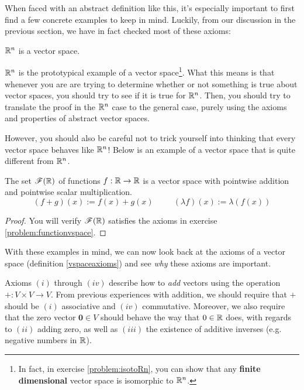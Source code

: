     
When faced with an abstract definition like this, it's especially important to first find a few concrete examples to keep in mind.  Luckily, from our discussion in the previous section, we have in fact checked most of these axioms:
    
    
    \begin{example}
    \vspace{-1em}
    \begin{theorem}
    $\mathbb{R}^n$ is a vector space.
    \end{theorem}
    \end{example}
    
    $\mathbb{R}^n$ is the prototypical example of a vector space\footnote{In fact, in exercise \ref{problem:isotoRn}, you can show that any \textbf{finite dimensional} vector space is isomorphic to $\mathbb{R}^n$.}.  What this means is that whenever you are are trying to determine whether or not something is true about vector spaces, you should try to see if it is true for $\mathbb{R}^n$.  Then, you should try to translate the proof in the $\mathbb{R}^n$ case to the general case, purely using the axioms and properties of abstract vector spaces.
    
    However, you should also be careful not to trick yourself into thinking that every vector space behaves like $\mathbb{R}^n$!  Below is an example of a vector space that is quite different from $\mathbb{R}^n$. 
    
    \begin{example}
    \vspace{-1em}
    \begin{theorem}\label{functionsvspace}
    The set $\mathscr{F}(\mathbb{R})$ of functions $f : \mathbb{R} \to \mathbb{R}$ is a vector space with pointwise addition and pointwise scalar multiplication.  $$(f + g)(x) := f(x) + g(x) \ \qquad \ (\lambda f)(x) := \lambda (f(x))$$
    \end{theorem}

    \begin{proof}
         You will verify $\mathscr{F}(\mathbb{R})$ satisfies the axioms in exercise \ref{problem:functionvspace}.
    \end{proof}
    
    \end{example}

    With these examples in mind, we can now look back at the axioms of a vector space (definition \ref{vspaceaxioms}) and see \textit{why} these axioms are important.

    Axioms $(i)$ through $(iv)$ describe how to \textit{add} vectors using the operation $+ : V \times V \to V$.  From previous experiences with addition, we should require that $+$ should be $(i)$ associative and $(iv)$ commutative.  Moreover, we also require that the zero vector $\bm{0} \in V$ should behave the way that $0 \in \mathbb{R}$ does, with regards to $(ii)$ adding zero, as well as $(iii)$ the existence of additive inverses (e.g. negative numbers in $\mathbb{R}$).

